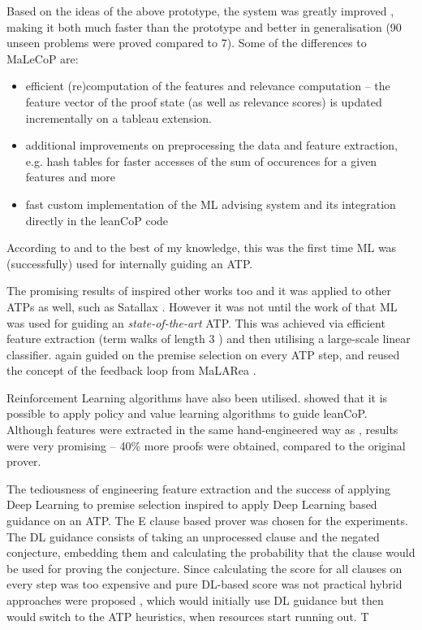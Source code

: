 \documentclass{article}
\begin{document}
Based on the ideas of the above prototype, the system was greatly improved
\citep{femalecop}, making it both much faster than the prototype and better in
generalisation (90 unseen problems were proved compared to 7). Some of the
differences to MaLeCoP are:
\begin{itemize}
    \item efficient (re)computation of the features and relevance
        computation -- the feature vector of the proof state (as well as
        relevance scores) is updated incrementally on a tableau extension.
    \item additional improvements on preprocessing the data and feature
        extraction, e.g. hash tables for faster accesses of the sum of
        occurences for a given features and more
    \item fast custom implementation of the ML advising system and its
        integration directly in the leanCoP code
\end{itemize}
According to \cite{femalecop} and to the best of my knowledge, this was
the first time ML was (successfully) used for internally guiding an ATP.

\nocite{SatallaxProver}

The promising results of \cite{femalecop} inspired other works too and it was
applied to other ATPs as well, such as Satallax \citep{Satallax}. However it
was not until the work of \cite{Enigma} that ML was used for guiding an
\emph{state-of-the-art} ATP. This was achieved via efficient feature extraction
(term walks of length 3 \citep[\S 3.2]{Enigma}) and then utilising a large-scale
linear classifier. \cite{Enigma} again guided on the premise selection on every
ATP step, and reused the concept of the feedback loop from MaLARea
\citep{MaLARea}.

Reinforcement Learning algorithms have also been utilised. \cite{RLTP} showed that
it is possible to apply policy and value learning algorithms to guide
leanCoP. Although features were extracted in the same
hand-engineered way as \cite{Enigma}, results were very promising -- 40\% more
proofs were obtained, compared to the original prover.

The tediousness of engineering feature extraction and the success of applying
Deep Learning to premise selection \citep{DeepMath} inspired \cite{DNGPS} to
apply Deep Learning based guidance on an ATP. The E clause based prover was
chosen for the experiments. The DL guidance consists of taking an unprocessed
clause and the negated conjecture, embedding them and calculating the
probability that the clause would be used for proving the conjecture. Since
calculating the score for all clauses on every step was too expensive and pure
DL-based score was not practical hybrid approaches were proposed \citep[\S
5.2.1]{DNGPS}, which would initially use DL guidance but then would switch to
the ATP heuristics, when resources start running out. T
\end{document}
